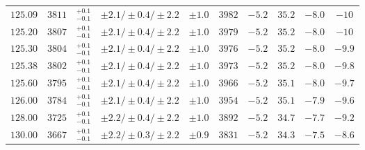 \begin{table}[ht]
\begin{center}
\begin{small}
\begin{tabular}{cccccccc|cc}
$125.09$ & $3811$ & $^{+0.1}_{-0.1}$ & $\pm 2.1/\pm 0.4/\pm 2.2$ & $\pm 1.0$ & $3982$ & $-5.2$ & $35.2 $ & $-8.0$ & $-10  $ \\
$125.20$ & $3807$ & $^{+0.1}_{-0.1}$ & $\pm 2.1/\pm 0.4/\pm 2.2$ & $\pm 1.0$ & $3979$ & $-5.2$ & $35.2 $ & $-8.0$ & $-10  $ \\
$125.30$ & $3804$ & $^{+0.1}_{-0.1}$ & $\pm 2.1/\pm 0.4/\pm 2.2$ & $\pm 1.0$ & $3976$ & $-5.2$ & $35.2 $ & $-8.0$ & $-9.9 $ \\
$125.38$ & $3802$ & $^{+0.1}_{-0.1}$ & $\pm 2.1/\pm 0.4/\pm 2.2$ & $\pm 1.0$ & $3973$ & $-5.2$ & $35.2 $ & $-8.0$ & $-9.8 $ \\
$125.60$ & $3795$ & $^{+0.1}_{-0.1}$ & $\pm 2.1/\pm 0.4/\pm 2.2$ & $\pm 1.0$ & $3966$ & $-5.2$ & $35.1 $ & $-8.0$ & $-9.7 $ \\
$126.00$ & $3784$ & $^{+0.1}_{-0.1}$ & $\pm 2.1/\pm 0.4/\pm 2.2$ & $\pm 1.0$ & $3954$ & $-5.2$ & $35.1 $ & $-7.9$ & $-9.6 $ \\
$128.00$ & $3725$ & $^{+0.1}_{-0.1}$ & $\pm 2.2/\pm 0.4/\pm 2.2$ & $\pm 1.0$ & $3892$ & $-5.2$ & $34.7 $ & $-7.7$ & $-9.2 $ \\
$130.00$ & $3667$ & $^{+0.1}_{-0.1}$ & $\pm 2.2/\pm 0.3/\pm 2.2$ & $\pm 0.9$ & $3831$ & $-5.2$ & $34.3 $ & $-7.5$ & $-8.6 $ \\
\bottomrule
\end{tabular}%
\end{small}%
\end{center}%
\end{table}

